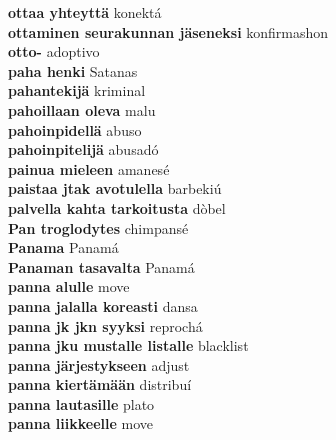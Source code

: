 \textbf{ ottaa yhteyttä  } konektá \\
\textbf{ ottaminen seurakunnan jäseneksi  } konfirmashon \\
\textbf{ otto-  } adoptivo \\
\textbf{ paha henki  } Satanas \\
\textbf{ pahantekijä  } kriminal \\
\textbf{ pahoillaan oleva  } malu \\
\textbf{ pahoinpidellä  } abuso \\
\textbf{ pahoinpitelijä  } abusadó \\
\textbf{ painua mieleen  } amanesé \\
\textbf{ paistaa jtak avotulella  } barbekiú \\
\textbf{ palvella kahta tarkoitusta  } dòbel \\
\textbf{ Pan troglodytes  } chimpansé \\
\textbf{ Panama  } Panamá \\
\textbf{ Panaman tasavalta  } Panamá \\
\textbf{ panna alulle  } move \\
\textbf{ panna jalalla koreasti  } dansa \\
\textbf{ panna jk jkn syyksi  } reprochá \\
\textbf{ panna jku mustalle listalle  } blacklist \\
\textbf{ panna järjestykseen  } adjust \\
\textbf{ panna kiertämään  } distribuí \\
\textbf{ panna lautasille  } plato \\
\textbf{ panna liikkeelle  } move \\
